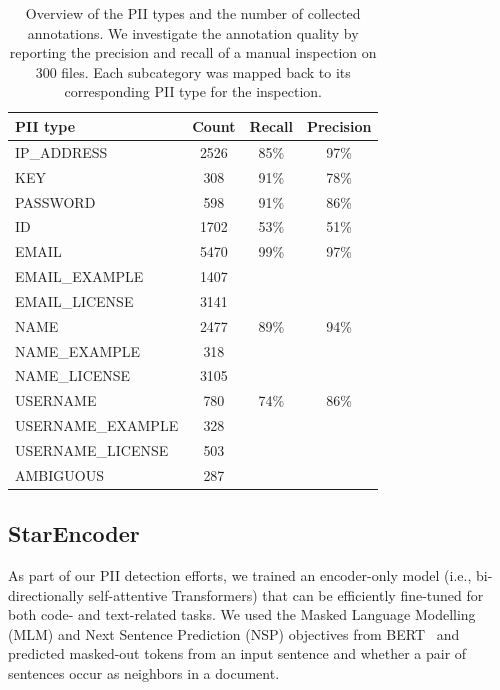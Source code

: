 \documentclass[10pt]{article} %
\begin{document}
\begin{table}[ht]
\centering
\begin{tabular}{lccc}
\toprule
\textbf{PII type} & \textbf{Count} & \textbf{Recall} & \textbf{Precision}\\
\midrule
IP\_ADDRESS & 2526 & 85\% & 97\% \\
KEY & 308 & 91\% & 78\% \\
PASSWORD & 598 & 91\% & 86\%\\
ID & 1702 & 53\% & 51\% \\

EMAIL & 5470 & 99\% & 97\%\\
EMAIL\_EXAMPLE & 1407 \\
EMAIL\_LICENSE & 3141 \\

NAME & 2477 & 89\% & 94\% \\
NAME\_EXAMPLE & 318 \\
NAME\_LICENSE & 3105 \\

USERNAME & 780 & 74\% & 86\% \\
USERNAME\_EXAMPLE & 328 \\
USERNAME\_LICENSE & 503 \\

AMBIGUOUS & 287 \\ \bottomrule
\end{tabular}
\caption{Overview of the PII types and the number of collected annotations. We investigate the annotation quality by reporting the precision and recall of a manual inspection on 300 files. Each subcategory was mapped back to its corresponding PII type for the inspection.}
\label{tab:dist_pii}
\end{table}


\subsection{StarEncoder}\label{sec:bigcode_encoder}
As part of our PII detection efforts, we trained an encoder-only model (i.e., bi-directionally self-attentive Transformers) that can be efficiently fine-tuned for both code- and text-related tasks. We used the Masked Language Modelling (MLM) and Next Sentence Prediction (NSP) objectives from BERT~\citep{devlin2018bert,liu2019roberta} and predicted masked-out tokens from an input sentence and whether a pair of sentences occur as neighbors in a document. 
\end{document}
